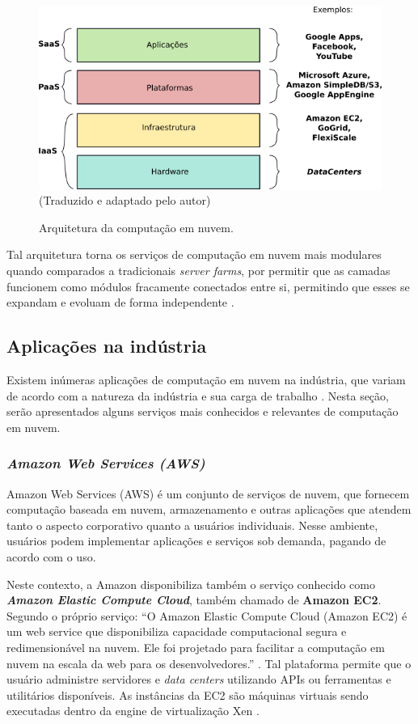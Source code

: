 \documentclass[
	12pt,				%
	oneside,			%
	a4paper,			%
	chapter=TITLE,		%
	english,			%
	french,				%
	spanish,			%
	brazil				%
	]{abntex2}
\begin{document}
\begin{figure}[ht]
	\caption{Arquitetura da computação em nuvem.}
	\includegraphics{images/arqcompnuvem.png}
	\centering
	\label{fig:arqcompnuvem}
	\textual (Traduzido e adaptado pelo autor)
\end{figure}

Tal arquitetura torna os serviços de computação em nuvem mais modulares quando comparados a tradicionais \emph{server farms}, por permitir que as camadas funcionem como módulos fracamente conectados entre si, permitindo que esses se expandam e evoluam de forma independente \cite[p. 9]{zhang2010cloud}.

\subsection{Aplicações na indústria}

Existem inúmeras aplicações de computação em nuvem na indústria, que variam de acordo com a natureza da indústria e sua carga de trabalho \cite[p. 10]{khan2018cloud}. Nesta seção, serão apresentados alguns serviços mais conhecidos e relevantes de computação em nuvem.

\subsubsection{\emph{Amazon Web Services (AWS)}}

Amazon Web Services (AWS) \cite{aws} é um conjunto de serviços de nuvem, que fornecem computação baseada em nuvem, armazenamento e outras aplicações que atendem tanto o aspecto corporativo quanto a usuários individuais. Nesse ambiente, usuários podem implementar aplicações e serviços sob demanda, pagando de acordo com o uso. \cite[p. 13]{zhang2010cloud}

Neste contexto, a Amazon disponibiliza também o serviço conhecido como \emph{\textbf{Amazon Elastic Compute Cloud}}, também chamado de \textbf{Amazon EC2}. Segundo o próprio serviço: ``O Amazon Elastic Compute Cloud (Amazon EC2) é um web service que disponibiliza capacidade computacional segura e redimensionável na nuvem. Ele foi projetado para facilitar a computação em nuvem na escala da web para os desenvolvedores.'' \cite{amazonec2}. Tal plataforma permite que o usuário administre servidores e \emph{data centers} utilizando APIs ou ferramentas e utilitários disponíveis. As instâncias da EC2 são máquinas virtuais sendo executadas dentro da engine de virtualização Xen \cite{xenengine, zhang2010cloud}.
\end{document}
